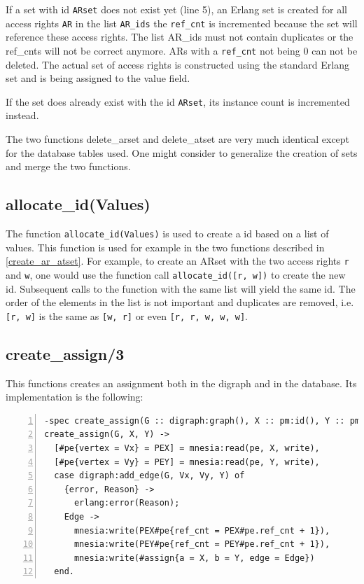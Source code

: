 \documentclass[12pt,a4paper,titlepage]{book}
\begin{document}
		If a set with id \lstinline|ARset| does not exist yet (line 5), an Erlang set is created for all access rights \lstinline|AR| in the list \lstinline|AR_ids| the \lstinline|ref_cnt| is incremented because the set will reference these access rights. The list AR\_ids must not contain duplicates or the ref\_cnts will not be correct anymore. ARs with a \lstinline|ref_cnt| not being 0 can not be deleted. The actual set of access rights is constructed using the standard Erlang set and is being assigned to the value field. 
		
		If the set does already exist with the id \lstinline|ARset|, its instance count is incremented instead.
		
		The two functions delete\_arset and delete\_atset are very much identical except for the database tables used. One might consider to generalize the creation of sets and merge the two functions.
		
	\subsection{allocate\_id(Values)}
	
		The function \lstinline|allocate_id(Values)| is used to create a id based on a list of values. This function is used for example in the two functions described in \ref{create_ar_atset}. For example, to create an ARset with the two access rights \lstinline|r| and \lstinline|w|, one would use the function call \lstinline|allocate_id([r, w])| to create the new id.  Subsequent calls to the function with the same list will yield the same id. The order of the elements in the list is not important and duplicates are removed, i.e. \lstinline|[r, w]| is the same as \lstinline|[w, r]| or even \lstinline|[r, r, w, w, w]|.
		
	\subsection{create\_assign/3}
	
		This functions creates an assignment both in the digraph and in the database. Its implementation is the following:
		
		\begin{lstlisting}[caption={create\_assign/3}, basicstyle=\footnotesize, breaklines=false, numbers=left]
-spec create_assign(G :: digraph:graph(), X :: pm:id(), Y :: pm:id()) -> ok | no_return().
create_assign(G, X, Y) ->
  [#pe{vertex = Vx} = PEX] = mnesia:read(pe, X, write),
  [#pe{vertex = Vy} = PEY] = mnesia:read(pe, Y, write),
  case digraph:add_edge(G, Vx, Vy, Y) of
    {error, Reason} ->
      erlang:error(Reason);
    Edge ->
      mnesia:write(PEX#pe{ref_cnt = PEX#pe.ref_cnt + 1}),
      mnesia:write(PEY#pe{ref_cnt = PEY#pe.ref_cnt + 1}),
      mnesia:write(#assign{a = X, b = Y, edge = Edge})
  end.\end{lstlisting}
  
\end{document}

